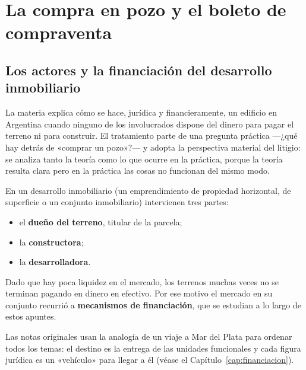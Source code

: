 \documentclass[12pt,oneside]{book}
\begin{document}

\chapter[La compra en pozo]{La compra en pozo y el boleto de compraventa}

\section{Los actores y la financiación del desarrollo inmobiliario}

La materia explica cómo se hace, jurídica y financieramente, un edificio en Argentina cuando ninguno de los involucrados dispone del dinero para pagar el terreno ni para construir. El tratamiento parte de una pregunta práctica —¿qué hay detrás de «comprar un pozo»?— y adopta la perspectiva material del litigio: se analiza tanto la teoría como lo que ocurre en la práctica, porque la teoría resulta clara pero en la práctica las cosas no funcionan del mismo modo.

En un desarrollo inmobiliario (un emprendimiento de propiedad horizontal, de superficie o un conjunto inmobiliario) intervienen tres partes:

\begin{itemize}
    \item el \textbf{dueño del terreno}, titular de la parcela;
    \item la \textbf{constructora};
    \item la \textbf{desarrolladora}.
\end{itemize}

Dado que hay poca liquidez en el mercado, los terrenos muchas veces no se terminan pagando en dinero en efectivo. Por ese motivo el mercado en su conjunto recurrió a \textbf{mecanismos de financiación}, que se estudian a lo largo de estos apuntes.

\begin{note}
Las notas originales usan la analogía de un viaje a Mar del Plata para ordenar todos los temas: el destino es la entrega de las unidades funcionales y cada figura jurídica es un «vehículo» para llegar a él (véase el Capítulo~\ref{cap:financiacion}).
\end{note}
\end{document}
